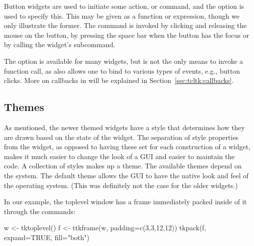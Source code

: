 Button widgets are used to initiate  some action, or
command, and the  option is used to specify this. This
may be given as a function or expression, though we only illustrate
the former. The command is invoked by clicking and releasing the mouse
on the button, by pressing the space bar when the button has the focus
or by calling the widget's 
subcommand. 

The  option is available for many widgets, but is not
the only means to invoke a function call, as \Tk{} also allows one to
bind to various types of events, e.g., button clicks.  More on
callbacks in  will be explained in
Section~\ref{sec:tcltk:callbacks}.




\subsection{Themes}
\label{sec:tcltk:overview:themes}


As mentioned, the newer themed widgets have a style that determines
how they are drawn based on the state of the widget. The separation of
style properties from the widget, as opposed to having these set for
each construction of a widget, makes it much easier to change the look
of a GUI and easier to maintain the code. A collection of styles makes
up a theme. The available themes depend on the system. The default
theme allows the GUI to have the native look and feel of the operating
system. (This was definitely not the case for the older \TK\/
widgets.)

In our example, the toplevel window has a frame immediately packed
inside of it through the commands:
\begin{Schunk}
\begin{Sinput}
 w <- tktoplevel()
 f <- ttkframe(w, padding=c(3,3,12,12))
 tkpack(f, expand=TRUE, fill="both")
\end{Sinput}
\end{Schunk}

